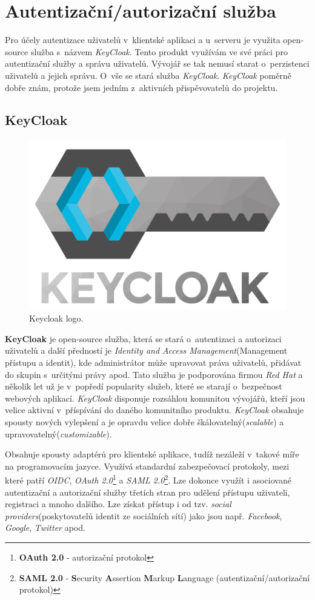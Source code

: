 \newpage
\section{Autentizační/autorizační služba}
\label{pouzite:auth}
Pro účely autentizace uživatelů v~klientské aplikaci a u~serveru je využita open-source služba s~názvem \emph{KeyCloak}.
Tento produkt využívám ve své práci pro autentizační služby a správu uživatelů.
Vývojář se tak nemusí starat o~perzistenci uživatelů a jejich správu.
O~vše se stará služba \emph{KeyCloak}.
\emph{KeyCloak} poměrně dobře znám, protože jsem jedním z~aktivních přispěvovatelů do projektu.

\subsection*{KeyCloak}
\label{terminy:keycloak}

\begin{figure}[hbt]
  \centering
  \includegraphics[width=.25 \linewidth]{obrazky-figures/keycloak2.png}
  \caption{Keycloak logo.~\cite{keycloak}}
\end{figure}

\textbf{KeyCloak} je open-source služba, která se stará o~autentizaci a autorizaci uživatelů a další předností je \emph{Identity and Access Management}(Management přístupu a identit),
kde administrátor může upravovat práva uživatelů, přidávat do skupin s~určitými právy apod.
Tato služba je podporována firmou \emph{Red Hat} a několik let už je v~popředí popularity služeb, které se starají o~bezpečnost webových aplikací. \emph{KeyCloak} disponuje rozsáhlou komunitou vývojářů, kteří jsou velice aktivní v~příspívání do daného komunitního produktu.
\emph{KeyCloak} obsahuje spousty nových vylepšení a je opravdu velice dobře škálovatelný(\emph{scalable}) a upravovatelný(\emph{customizable}).

Obsahuje spousty adaptérů pro klientské aplikace, tudíž nezáleží v~takové míře na programovacím jazyce.
Využívá standardní zabezpečovací protokoly, mezi které patří \emph{OIDC}, \emph{OAuth 2.0}\footnote{\textbf{OAuth 2.0} - autorizační protokol} a \emph{SAML 2.0}\footnote{\textbf{SAML 2.0} - \textbf{S}ecurity \textbf{A}ssertion \textbf{M}arkup \textbf{L}anguage (autentizační/autorizační protokol)}.
Lze dokonce využít i asociované autentizační a autorizační služby třetích stran pro udělení přístupu uživateli, registraci a mnoho dalšího.
Lze získat přístup i od tzv. \emph{social providers}(poskytovatelů identit ze sociálních sítí) jako jsou např. \emph{Facebook}, \emph{Google}, \emph{Twitter} apod.

